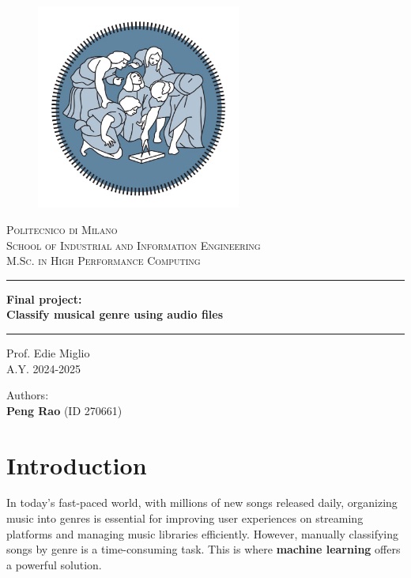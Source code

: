\documentclass[11.5pt]{article}
\begin{document}
\begin{titlingpage}
    \begin{center}
        \begin{figure}
            \centering
            \includegraphics[width=0.6\textwidth]{graphics/logopolimi_mod.jpg}
        \end{figure}
        \Large{\textsc{Politecnico di Milano \\ School of Industrial and Information Engineering \\ M.Sc. in High Performance Computing}}

        \vspace{1cm}

        \rule{0.95\textwidth}{0.7mm}
        {\Large{\textbf{Final project: \\Classify musical genre using audio files}}}
        \rule{0.95\textwidth}{0.7mm}

        \vspace{1cm}

        \large{Prof. Edie Miglio \\ A.Y. 2024-2025}

        \vspace{1cm}

        \large{Authors: \\ \textbf{Peng Rao} (ID 270661)}
    \end{center}

\end{titlingpage}


\tableofcontents

\clearpage

\setcounter{page}{1}

\section{Introduction} \label{sec:introduction}
In today's fast-paced world, with millions of new songs released daily, organizing music into genres is essential for improving user experiences on streaming platforms and managing music libraries efficiently. However, manually classifying songs by genre is a time-consuming task. This is where \textbf{machine learning} offers a powerful solution.
\end{document}

